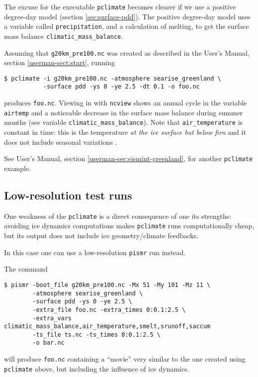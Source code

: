 \documentclass[titlepage,letterpaper,final]{scrartcl}
\begin{document}
The excuse for the executable \texttt{pclimate} becomes clearer if we use a positive degree-day
model (section \ref{sec:surface-pdd}).  The positive degree-day
model uses a variable called \texttt{precipitation}, and a calculation of melting, to get the
surface mass balance \texttt{climatic_mass_balance}.

Assuming that \texttt{g20km_pre100.nc} was created as described in the User's Manual, section \ref*{userman-sect:start}, running
\begin{verbatim}
$ pclimate -i g20km_pre100.nc -atmosphere searise_greenland \
           -surface pdd -ys 0 -ye 2.5 -dt 0.1 -o foo.nc
\end{verbatim}%
produces \texttt{foo.nc}. Viewing in with \texttt{ncview} shows an annual cycle in the variable \texttt{airtemp} and a noticeable decrease in the surface mass balance during summer months (see variable \texttt{climatic_mass_balance}). Note that \texttt{air_temperature} is constant in time: this is the temperature \emph{at the ice surface but below firn} and it does not include seasonal variations \cite{Hock05}.

See User's Manual, section \ref*{userman-sec:eismint-greenland}, for another \texttt{pclimate} example.

\subsection{Low-resolution test runs}
\label{sec:low-resolution-test-runs}

One weakness of the \texttt{pclimate} is a direct consequence of one its strengths: avoiding ice dynamics computations makes \texttt{pclimate} runs computationally cheap, but its output does not include ice geometry/climate feedbacks.

In this case one can use a low-resolution \texttt{pismr} run instead.

The command
\begin{verbatim}
$ pismr -boot_file g20km_pre100.nc -Mx 51 -My 101 -Mz 11 \
        -atmosphere searise_greenland \
        -surface pdd -ys 0 -ye 2.5 \
        -extra_file foo.nc -extra_times 0:0.1:2.5 \
        -extra_vars climatic_mass_balance,air_temperature,smelt,srunoff,saccum
        -ts_file ts.nc -ts_times 0:0.1:2.5 \
        -o bar.nc
\end{verbatim}%
will produce \texttt{foo.nc} containing a ``movie'' very similar to the one created using \texttt{pclimate} above, but including the influence of ice dynamics.
\end{document}
